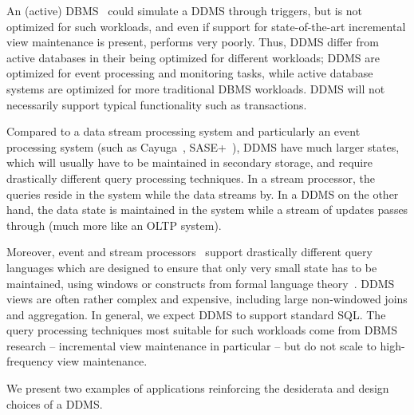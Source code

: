 An (active) DBMS~\cite{ceri-vldb:00} could simulate a DDMS through triggers, but
is not optimized for such workloads, and even if support for state-of-the-art
incremental view maintenance is present, performs very poorly. Thus, DDMS differ
from active databases in their being optimized for different workloads; DDMS are
optimized for event processing and monitoring tasks, while active database
systems are optimized for more traditional DBMS workloads. DDMS will not
necessarily support typical functionality such as transactions.



Compared to a data stream processing system and particularly an event processing
system (such as Cayuga~\cite{demers-sigmod:07}, SASE+~\cite{agrawal-sigmod:08}),
DDMS have much larger states, which will usually have to be maintained in
secondary storage, and require drastically different query processing
techniques. In a stream processor, the queries reside in the system while the
data streams by. In a DDMS on the other hand, the data state is maintained in
the system while a stream of updates passes through (much more like an OLTP
system).

%
Moreover, event and stream processors~\cite{abadi-vldbj:03, motwani-cidr:03,
chandrasekaran-cidr:03} support drastically different query languages which are
designed to ensure that only very small state has to be maintained, using
windows or constructs from formal language theory~\cite{white-pods:07}. DDMS
views are often rather complex and expensive, including large non-windowed joins
and aggregation. In general, we expect DDMS to support standard SQL.
The query processing techniques most suitable for such workloads come from DBMS
research -- incremental view maintenance in particular -- but do not scale to
high-frequency view maintenance.



\medskip

We present two examples of applications reinforcing the desiderata and design
choices of a DDMS.

